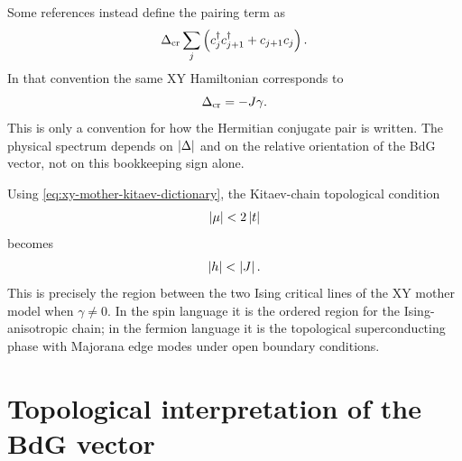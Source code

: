Some references instead define the pairing term as
\begin{equation}
    \Delta_{\rm cr}\sum_j
    \left(
        c_j^\dagger c_{j+1}^\dagger+c_{j+1}c_j
    \right).
\end{equation}
In that convention the same XY Hamiltonian corresponds to
\begin{equation}
\label{eq:xy-mother-kitaev-creation-dictionary}
    \Delta_{\rm cr}=-J\gamma.
\end{equation}
This is only a convention for how the Hermitian conjugate pair is written.  The
physical spectrum depends on $\left|\Delta\right|$ and on the relative orientation of the
BdG vector, not on this bookkeeping sign alone.

Using \cref{eq:xy-mother-kitaev-dictionary}, the Kitaev-chain topological
condition
\begin{equation}
    \left|\mu\right|<2\left|t\right|
\end{equation}
becomes
\begin{equation}
\label{eq:xy-mother-kitaev-topological-condition-spin}
    \left|h\right|<\left|J\right|.
\end{equation}
This is precisely the region between the two Ising critical lines of the XY
mother model when $\gamma\neq0$.  In the spin language it is the ordered region
for the Ising-anisotropic chain; in the fermion language it is the topological
superconducting phase with Majorana edge modes under open boundary conditions.

\section{Topological interpretation of the BdG vector}
\label{sec:xy-bdg-vector-topological-interpretation}

